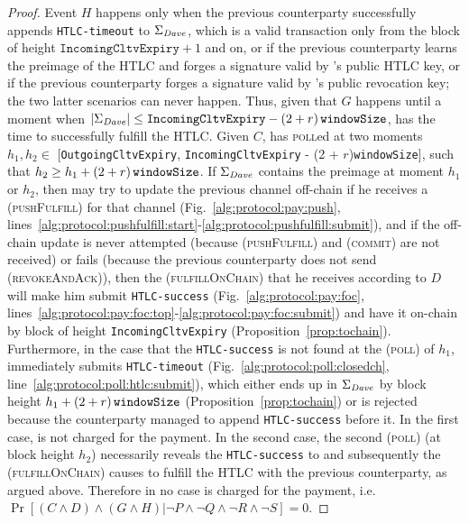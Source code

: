 \begin{proof}
  Event $H$ happens only when the previous counterparty successfully appends
  \texttt{HTLC-timeout} to $\Sigma_{\mathit{Dave}}$, which is a valid transaction only
  from the block of height $\mathtt{IncomingCltvExpiry} + 1$ and on, or if the
  previous counterparty learns the preimage of the HTLC and forges a signature
  valid by \dave's public HTLC key, or if the previous counterparty forges a
  signature valid by \dave's public revocation key; the two latter scenarios can
  never happen. Thus, given that $G$ happens until a moment when
  $|\Sigma_{\mathit{Dave}}| \leq \mathtt{IncomingCltvExpiry} - \left(2 + r\right)\texttt{windowSize}{}$, \dave{} has
  the time to successfully fulfill the HTLC. Given $C$, \dave{} has
  \textsc{poll}ed at two moments $h_1, h_2 \in$ [\texttt{OutgoingCltvExpiry},
  \texttt{IncomingCltvExpiry} - (2 + $r$)\texttt{windowSize}], such that $h_2
  \geq h_1 + \left(2 + r\right)\texttt{windowSize}{}$. If $\Sigma_{\mathit{Dave}}$ contains the preimage at moment
  $h_1$ or $h_2$, then \dave{} may try to update the previous channel off-chain
  if he receives a (\textsc{pushFulfill}) for that channel
  (Fig.~\ref{alg:protocol:pay:push},
  lines~\ref{alg:protocol:pushfulfill:start}-\ref{alg:protocol:pushfulfill:submit}),
  and if the off-chain update is never attempted (because (\textsc{pushFulfill})
  and (\textsc{commit}) are not received) or fails (because the previous
  counterparty does not send (\textsc{revokeAndAck})), then the
  (\textsc{fulfillOnChain}) that he receives according to $D$ will make him
  submit \texttt{HTLC-success} (Fig.~\ref{alg:protocol:pay:foc},
  lines~\ref{alg:protocol:pay:foc:top}-\ref{alg:protocol:pay:foc:submit}) and
  have it on-chain by block of height \texttt{IncomingCltvExpiry}
  (Proposition~\ref{prop:tochain}). Furthermore, in the case that the
  \texttt{HTLC-success} is not found at the (\textsc{poll}) of $h_1$, \dave{}
  immediately submits \texttt{HTLC-timeout}
  (Fig.~\ref{alg:protocol:poll:closedch},
  line~\ref{alg:protocol:poll:htlc:submit}), which either ends up in
  $\Sigma_{\mathit{Dave}}$ by block height $h_1 + \left(2 + r\right)\texttt{windowSize}{}$
  (Proposition~\ref{prop:tochain}) or is rejected because the counterparty
  managed to append \texttt{HTLC-success} before it. In the first case, \dave{}
  is not charged for the payment. In the second case, the second (\textsc{poll})
  (at block height $h_2$) necessarily reveals the \texttt{HTLC-success} to
  \dave{} and subsequently the (\textsc{fulfillOnChain}) causes \dave{} to
  fulfill the HTLC with the previous counterparty, as argued above. Therefore in
  no case \dave{} is charged for the payment, i.e. $\Pr[(C \wedge D) \wedge (G
  \wedge H) | \neg P \wedge \neg Q \wedge \neg R \wedge \neg S] = 0$.


\end{proof}
